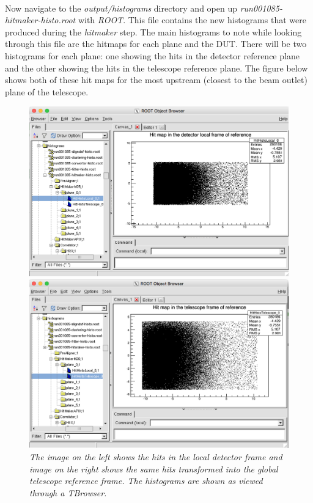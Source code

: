 \documentclass[11pt]{article}
\begin{document}
\paragraph{}
Now navigate to the \textit{output/histograms} directory and open up \textit{run001085-hitmaker-histo.root} with \textit{ROOT}. This file contains the new histograms that were produced during the \textit{hitmaker} step. The main histograms to note while looking through this file are the hitmaps for each plane and the DUT. There will be two histograms for each plane: one showing the hits in the detector reference plane and the other showing the hits in the telescope reference plane. The figure below shows both of these hit maps for the most upstream (closest to the beam outlet) plane of the telescope.
\newpage
\begin{figure}[h!]
	\begin{minipage}{0.5\textwidth}
		\centering
		\includegraphics[scale=0.3]{hitmaker_local.png}
	\end{minipage}
    \begin{minipage}{0.5\textwidth}
		\centering
		\includegraphics[scale=0.3]{hitmaker_telescope.png}
	\end{minipage}
	\caption{\textit{The image on the left shows the hits in the local detector frame and image on the right shows the same hits transformed into the global telescope reference frame. The histograms are shown as viewed through a TBrowser.}}
    \label{HVSV1}
\end{figure}
\end{document}
